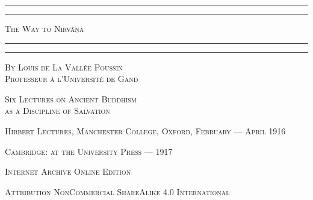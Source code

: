 \documentclass[a4paper, 11pt, oneside, english]{article}
\begin{document}
\begin{titlepage} %
	\centering %


	\rule{\textwidth}{1.6pt}\vspace*{-\baselineskip}\vspace*{2pt} %
	\rule{\textwidth}{0.4pt} %
	
	\vspace{1\baselineskip} %
	
	{\scshape\Huge The Way to Nirvāṇa}
	
	\vspace{1\baselineskip} %

	\rule{\textwidth}{0.4pt}\vspace*{-\baselineskip}\vspace{3.2pt} %
	\rule{\textwidth}{1.6pt} %
	
	\vspace{1\baselineskip} %
	
	
        {\scshape\Large By Louis de La Vallée Poussin\\\small Professeur à l'Université de Gand}
 
        \vspace{1.0\baselineskip}
		
        {\scshape \scriptsize Six Lectures on Ancient Buddhism \\ as a Discipline of Salvation} %

        \vspace*{\fill}    

	\vspace{1\baselineskip}

        {\footnotesize\scshape Hibbert Lectures, Manchester College, Oxford, February --- April 1916}
	
	{\footnotesize\scshape{Cambridge: at the University Press --- 1917}}
	
	\vspace{0.25\baselineskip} %

        {\scshape\small Internet Archive Online Edition}%
    
	{\scshape\footnotesize Attribution NonCommercial ShareAlike 4.0 International } %
\end{titlepage}
\end{document}
